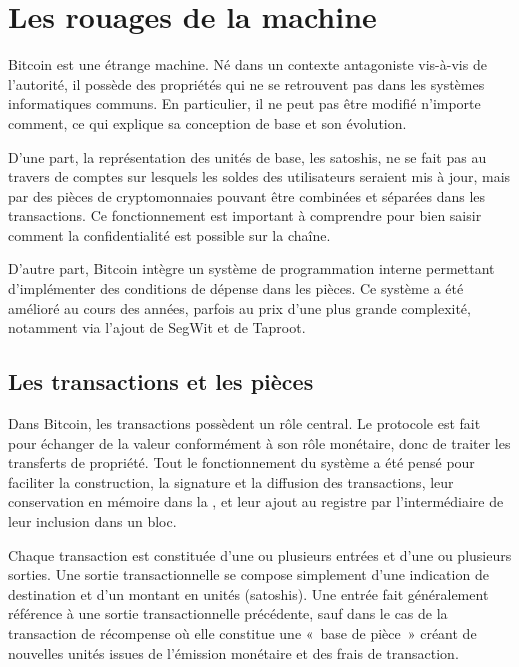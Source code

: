 
\chapter{Les rouages de la machine}
\label{ch:rouages}

Bitcoin est une étrange machine. Né dans un contexte antagoniste vis-à-vis de l'autorité, il possède des propriétés qui ne se retrouvent pas dans les systèmes informatiques communs. En particulier, il ne peut pas être modifié n'importe comment, ce qui explique sa conception de base et son évolution.

D'une part, la représentation des unités de base, les satoshis, ne se fait pas au travers de comptes sur lesquels les soldes des utilisateurs seraient mis à jour, mais par des pièces de cryptomonnaies pouvant être combinées et séparées dans les transactions. Ce fonctionnement est important à comprendre pour bien saisir comment la confidentialité est possible sur la chaîne.

D'autre part, Bitcoin intègre un système de programmation interne permettant d'implémenter des conditions de dépense dans les pièces. Ce système a été amélioré au cours des années, parfois au prix d'une plus grande complexité, notamment via l'ajout de SegWit et de Taproot.

\section*{Les transactions et les pièces} %

Dans Bitcoin, les transactions possèdent un rôle central. Le protocole est fait pour échanger de la valeur conformément à son rôle monétaire, donc de traiter les transferts de propriété. Tout le fonctionnement du système a été pensé pour faciliter la construction, la signature et la diffusion des transactions, leur conservation en mémoire dans la , et leur ajout au registre par l'intermédiaire de leur inclusion dans un bloc.

Chaque transaction est constituée d'une ou plusieurs entrées et d'une ou plusieurs sorties. Une sortie transactionnelle se compose simplement d'une indication de destination et d'un montant en unités (satoshis). Une entrée fait généralement référence à une sortie transactionnelle précédente, sauf dans le cas de la transaction de récompense où elle constitue une «~base de pièce~» créant de nouvelles unités issues de l'émission monétaire et des frais de transaction. %

